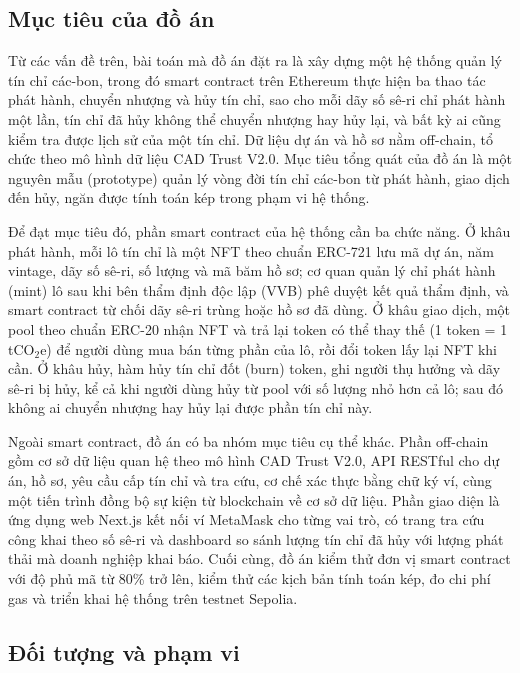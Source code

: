 \subsection*{Mục tiêu của đồ án}
\label{subsec:baitoan}
\label{subsec:muctieu}

Từ các vấn đề trên, bài toán mà đồ án đặt ra là xây dựng một hệ thống quản lý tín chỉ các-bon, trong đó smart contract trên Ethereum thực hiện ba thao tác phát hành, chuyển nhượng và hủy tín chỉ, sao cho mỗi dãy số sê-ri chỉ phát hành một lần, tín chỉ đã hủy không thể chuyển nhượng hay hủy lại, và bất kỳ ai cũng kiểm tra được lịch sử của một tín chỉ. Dữ liệu dự án và hồ sơ nằm off-chain, tổ chức theo mô hình dữ liệu CAD Trust V2.0. Mục tiêu tổng quát của đồ án là một nguyên mẫu (prototype) quản lý vòng đời tín chỉ các-bon từ phát hành, giao dịch đến hủy, ngăn được tính toán kép trong phạm vi hệ thống.

Để đạt mục tiêu đó, phần smart contract của hệ thống cần ba chức năng. Ở khâu phát hành, mỗi lô tín chỉ là một NFT theo chuẩn ERC-721 lưu mã dự án, năm vintage, dãy số sê-ri, số lượng và mã băm hồ sơ; cơ quan quản lý chỉ phát hành (mint) lô sau khi bên thẩm định độc lập (VVB) phê duyệt kết quả thẩm định, và smart contract từ chối dãy sê-ri trùng hoặc hồ sơ đã dùng. Ở khâu giao dịch, một pool theo chuẩn ERC-20 nhận NFT và trả lại token có thể thay thế (1 token = 1 tCO$_2$e) để người dùng mua bán từng phần của lô, rồi đổi token lấy lại NFT khi cần. Ở khâu hủy, hàm hủy tín chỉ đốt (burn) token, ghi người thụ hưởng và dãy sê-ri bị hủy, kể cả khi người dùng hủy từ pool với số lượng nhỏ hơn cả lô; sau đó không ai chuyển nhượng hay hủy lại được phần tín chỉ này.

Ngoài smart contract, đồ án có ba nhóm mục tiêu cụ thể khác. Phần off-chain gồm cơ sở dữ liệu quan hệ theo mô hình CAD Trust V2.0, API RESTful cho dự án, hồ sơ, yêu cầu cấp tín chỉ và tra cứu, cơ chế xác thực bằng chữ ký ví, cùng một tiến trình đồng bộ sự kiện từ blockchain về cơ sở dữ liệu. Phần giao diện là ứng dụng web Next.js kết nối ví MetaMask cho từng vai trò, có trang tra cứu công khai theo số sê-ri và dashboard so sánh lượng tín chỉ đã hủy với lượng phát thải mà doanh nghiệp khai báo. Cuối cùng, đồ án kiểm thử đơn vị smart contract với độ phủ mã từ 80\% trở lên, kiểm thử các kịch bản tính toán kép, đo chi phí gas và triển khai hệ thống trên testnet Sepolia.

\subsection*{Đối tượng và phạm vi}
\label{subsec:phamvi}


